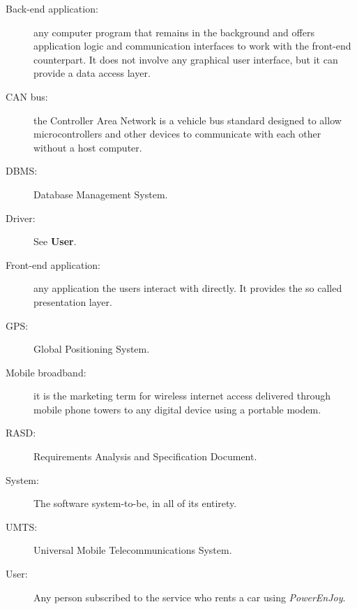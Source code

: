 \begin{description}
\item[Back-end application:] any computer program that remains in the background and offers application logic and communication interfaces to work with the front-end counterpart. It does not involve any graphical user interface, but it can provide a data access layer.
\item[CAN bus:] the Controller Area Network is a vehicle bus standard designed to allow microcontrollers and other devices to communicate with each other without a host computer.
\item[DBMS:] Database Management System.
\item[Driver:] See \textbf{User}.
\item[Front-end application:] any application the users interact with directly. It provides the so called presentation layer.
\item[GPS:] Global Positioning System.
\item[Mobile broadband:] it is the marketing term for wireless internet access delivered through mobile phone towers to any digital device using a portable modem.
\item[RASD:] Requirements Analysis and Specification Document.
\item[System:] The software system-to-be, in all of its entirety.
\item[UMTS:] Universal Mobile Telecommunications System.
\item[User:] Any person subscribed to the service who rents a car using \hbox{\emph{PowerEnJoy}}.
\end{description}

